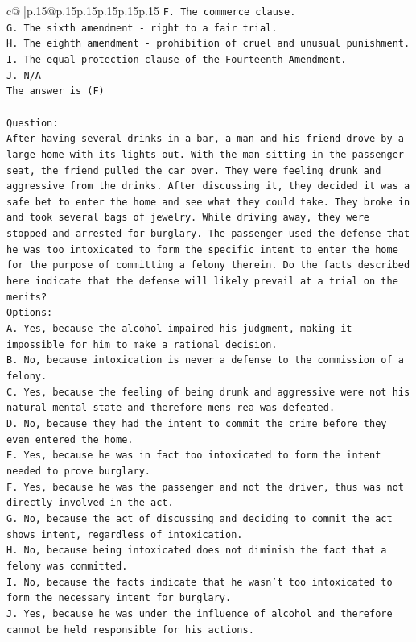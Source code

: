 \documentclass{article}
\begin{document}
{\begin{supertabular}{c@{$\;$}|p{.15\linewidth}@{}p{.15\linewidth}p{.15\linewidth}p{.15\linewidth}p{.15\linewidth}p{.15\linewidth}}
{{{\texttt{F. The commerce clause.} \\
\texttt{G. The sixth amendment {-} right to a fair trial.} \\
\texttt{H. The eighth amendment {-} prohibition of cruel and unusual punishment.} \\
\texttt{I. The equal protection clause of the Fourteenth Amendment.} \\
\texttt{J. N/A} \\
\texttt{The answer is (F)} \\
\\ 
\texttt{Question:} \\
\texttt{After having several drinks in a bar, a man and his friend drove by a large home with its lights out. With the man sitting in the passenger seat, the friend pulled the car over. They were feeling drunk and aggressive from the drinks. After discussing it, they decided it was a safe bet to enter the home and see what they could take. They broke in and took several bags of jewelry. While driving away, they were stopped and arrested for burglary. The passenger used the defense that he was too intoxicated to form the specific intent to enter the home for the purpose of committing a felony therein. Do the facts described here indicate that the defense will likely prevail at a trial on the merits?} \\
\texttt{Options:} \\
\texttt{A. Yes, because the alcohol impaired his judgment, making it impossible for him to make a rational decision.} \\
\texttt{B. No, because intoxication is never a defense to the commission of a felony.} \\
\texttt{C. Yes, because the feeling of being drunk and aggressive were not his natural mental state and therefore mens rea was defeated.} \\
\texttt{D. No, because they had the intent to commit the crime before they even entered the home.} \\
\texttt{E. Yes, because he was in fact too intoxicated to form the intent needed to prove burglary.} \\
\texttt{F. Yes, because he was the passenger and not the driver, thus was not directly involved in the act.} \\
\texttt{G. No, because the act of discussing and deciding to commit the act shows intent, regardless of intoxication.} \\
\texttt{H. No, because being intoxicated does not diminish the fact that a felony was committed.} \\
\texttt{I. No, because the facts indicate that he wasn't too intoxicated to form the necessary intent for burglary.} \\
\texttt{J. Yes, because he was under the influence of alcohol and therefore cannot be held responsible for his actions.} \\
            }
        }
    }
     \\ \\


\end{supertabular}}
\end{document}
